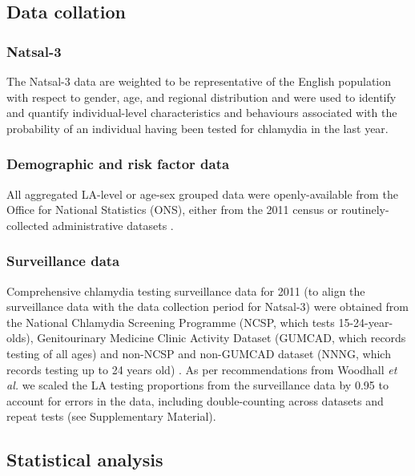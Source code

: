\documentclass[fleqn,10pt]{wlscirep}
\begin{document}
\subsection*{Data collation}

\subsubsection*{Natsal-3}
The Natsal-3 data are weighted to be representative of the English population with respect to gender, age, and regional distribution \cite{Mercer2013,Erens2013} and were used to identify and quantify individual-level characteristics and behaviours associated with the probability of an individual having been tested for chlamydia in the last year.

\subsubsection*{Demographic and risk factor data}
All aggregated LA-level or age-sex grouped data were openly-available from the Office for National Statistics (ONS), either from the 2011 census \cite{ONS_cesnsusdata} or routinely-collected administrative datasets \cite{OfficeforNationalStatistics2011, OfficeforNationalStatistics2011a, DepartmentforCommunitiesandLocalGovernment, ONS_conceptions, ONS_urbanrural}.

\subsubsection*{Surveillance data}
Comprehensive chlamydia testing surveillance data for 2011 (to align the surveillance data with the data collection period for Natsal-3) were obtained from the National Chlamydia Screening Programme (NCSP, which tests 15-24-year-olds), Genitourinary Medicine Clinic Activity Dataset (GUMCAD, which records testing of all ages) and non-NCSP and non-GUMCAD dataset (NNNG, which records testing up to 24 years old) \cite{PublicHealthEngland}. As per recommendations from Woodhall {\it et al.} \cite{Woodhall2013} we scaled the LA testing proportions from the surveillance data by 0.95 to account for errors in the data, including double-counting across datasets and repeat tests (see Supplementary Material).

\subsection*{Statistical analysis}
\end{document}
